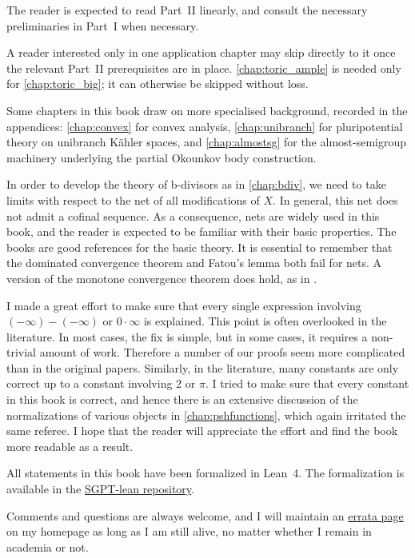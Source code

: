 The reader is expected to read Part~II linearly, and consult the necessary preliminaries in Part~I when necessary.

A reader interested only in one application chapter may skip directly to it once the relevant Part~II prerequisites are in place. \cref{chap:toric_ample} is needed only for \cref{chap:toric_big}; it can otherwise be skipped without loss.

Some chapters in this book draw on more specialised background, recorded in the appendices: \cref{chap:convex} for convex analysis, \cref{chap:unibranch} for pluripotential theory on unibranch K\"ahler spaces, and \cref{chap:almostsg} for the almost-semigroup machinery underlying the partial Okounkov body construction.

In order to develop the theory of b-divisors as in \cref{chap:bdiv}, we need to take limits with respect to the net of all modifications of $X$. In general, this net does not admit a cofinal sequence.
As a consequence, nets are widely used in this book, and the reader is expected to be familiar with their basic properties. The books \cite{Wil70, Kel75} are good references for the basic theory.
It is essential to remember that the dominated convergence theorem and Fatou's lemma both fail for nets. A version of the monotone convergence theorem does hold, as in \cite[Proposition~7.12]{Fol99}.

I made a great effort to make sure that every single expression involving $(-\infty)-(-\infty)$ or $0\cdot \infty$ is explained. This point is often overlooked in the literature. In most cases, the fix is simple, but in some cases, it requires a non-trivial amount of work. Therefore a number of our proofs seem more complicated than in the original papers. Similarly, in the literature, many constants are only correct up to a constant involving $2$ or $\pi$. I tried to make sure that every constant in this book is correct, and hence there is an extensive discussion of the normalizations of various objects in \cref{chap:pshfunctions}, which again irritated the same referee. I hope that the reader will appreciate the effort and find the book more readable as a result.

All statements in this book have been formalized in Lean~4. The formalization is available in the \href{https://github.com/MingchenXia/SGPT-lean}{SGPT-lean repository}.

Comments and questions are always welcome, and I will maintain an \href{https://mingchenxia.github.io/Lectures/Errata_SGPT.pdf}{errata page} on my homepage as long as I am still alive, no matter whether I remain in academia or not.


